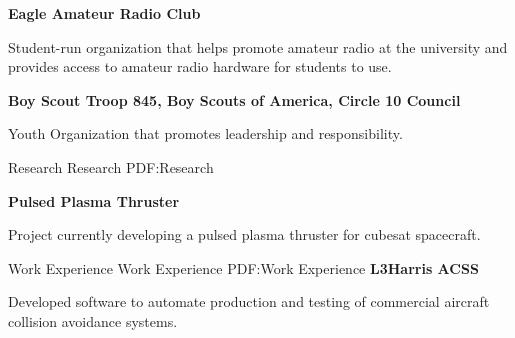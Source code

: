 \documentclass[letterpaper,ddMMMyyyy,nonstopmode]{simpleresumecv}
\newcommand{\descriptionWidth}{33em}
\newenvironment{Description}
{%
	\SmallGap
	\par
	\begin{Detail}
		\Item
		\begin{minipage}{\descriptionWidth}
}
{\par
\end{minipage}
\end{Detail}
}
\begin{document}
\begin{Body}

        \Entry
        \textbf{Eagle Amateur Radio Club}
        \hfill{}
        \begin{Description}
            Student-run organization that helps promote amateur radio at the university and provides access to amateur radio hardware for students to use.

        \end{Description}

		\Gap

		\Entry
		\textbf{Boy Scout Troop 845, Boy Scouts of America, Circle 10 Council}
		\hfill{}

		\begin{Description}
				Youth Organization that promotes leadership and responsibility.
		\end{Description}


		\Section
		{Research}
		{Research}
		{PDF:Research}

		\Entry
		\textbf{Pulsed Plasma Thruster}
		\hfill

		\begin{Description}
			Project currently developing a pulsed plasma thruster for cubesat spacecraft.
		\end{Description}


		\Section
		{Work Experience}
		{Work Experience}
		{PDF:Work Experience}
		\Entry\textbf{L3Harris ACSS}\hfill{}

			\begin{Description}
				Developed software to automate production and testing of commercial aircraft collision avoidance systems.
			\end{Description}
		\Gap



\end{Body}
\end{document}
